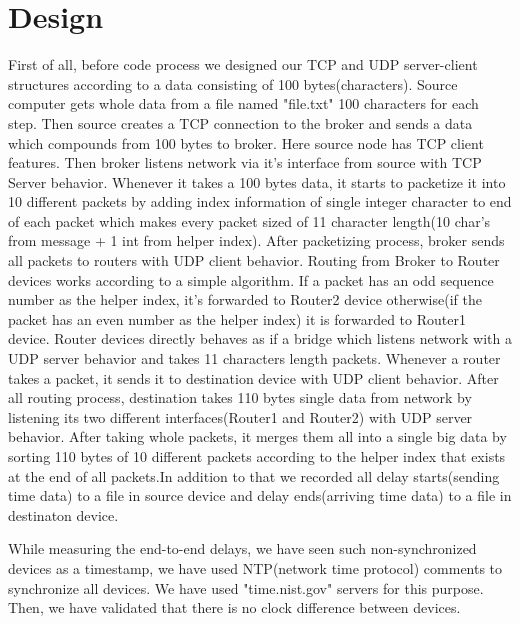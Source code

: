 \documentclass[12pt]{article}
\begin{document}
\section*{Design}
First of all, before code process we designed our TCP and UDP server-client structures according to a data consisting of 100 bytes(characters). Source computer gets whole data from a file named "file.txt" 100 characters for each step. Then source creates a TCP connection to the broker and sends a data which compounds from 100 bytes to broker. Here source node has TCP client features. Then broker listens network via it's interface from source with TCP Server behavior. Whenever it takes a 100 bytes data, it starts to packetize it into 10 different packets by adding index information of single integer character to end of each packet which makes every packet sized of 11 character length(10 char's from message + 1 int from helper index). After packetizing process, broker sends all packets to routers with UDP client behavior. Routing from Broker to Router devices works according to a simple algorithm. If a packet has an odd sequence number as the helper index, it's forwarded to Router2 device otherwise(if the packet has an even number as the helper index) it is forwarded to Router1 device. Router devices directly behaves as if a bridge which listens network with a UDP server behavior and takes 11 characters length packets. Whenever a router takes a packet, it sends it to destination device with UDP client behavior. After all routing process, destination takes 110 bytes single data from network by listening its two different interfaces(Router1 and Router2) with UDP server behavior. After taking whole packets, it merges them all into a single big data by sorting 110 bytes of 10 different packets according to the helper index that exists at the end of all packets.In addition to that we recorded all delay starts(sending time data) to a file in source device and delay ends(arriving time data) to a file in destinaton device.

While measuring the end-to-end delays, we have seen such non-synchronized devices as a timestamp, we have used NTP(network time protocol) comments to  synchronize all devices. We have used "time.nist.gov" servers for this purpose. Then, we have validated that there is no clock difference between devices. 
\end{document}
